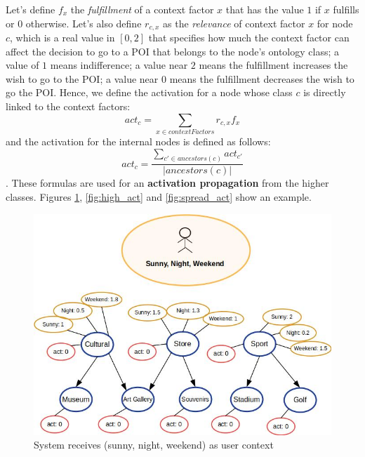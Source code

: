 Let's define $f_x$ the \textit{fulfillment} of a context factor $x$ that has the value $1$ if $x$ fulfills or $0$ otherwise. Let's also define $r_{c,x}$ as the \textit{relevance} of context factor $x$ for node $c$, which is a real value in $[0, 2]$ that specifies how much the context factor can affect the decision to go to a POI that belongs to the node's ontology class; a value of $1$ means indifference; a value near $2$ means the fulfillment increases the wish to go to the POI; a value near $0$ means the fulfillment decreases the wish to go the POI. Hence, we define the activation for a node whose class $c$ is directly linked to the context factors:
\begin{equation} \label{eq:high_activation}
    act_c = \sum_{x \in contextFactors} r_{c,x} f_x
\end{equation}
and the activation for the internal nodes is defined as follows:
\begin{equation} \label{eq:activation}
    act_c = \frac{\displaystyle \sum_{c' \in ancestors(c)} act_{c'}}{|ancestors(c)|}
\end{equation}.
These formulas are used for an \textbf{activation propagation} from the higher classes. Figures \ref{fig:init_act}, \ref{fig:high_act} and \ref{fig:spread_act} show an example.

\begin{figure}[h]
\centering
\includegraphics[scale=0.45]{draws/initial_act.jpg}
\caption{System receives (sunny, night, weekend) as user context}
\label{fig:init_act}
\end{figure}

